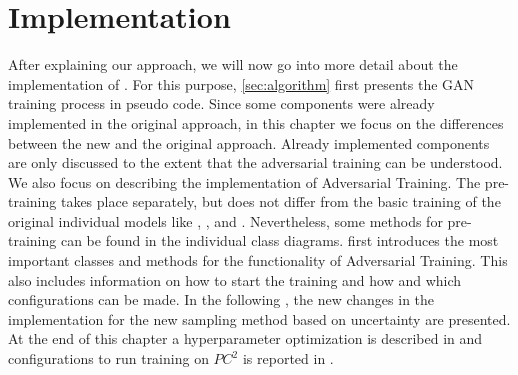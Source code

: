 \chapter{Implementation}
\label{ch:implementation}


After explaining our approach, we will now go into more detail about the implementation of \ucgan.
For this purpose, \autoref{sec:algorithm} first presents the \ac{GAN} training process in pseudo code.
Since some components were already implemented in the original \kbgan approach, in this chapter we focus on the differences between the new \ucgan and the original approach.
Already implemented components are only discussed to the extent that the adversarial training can be understood.
We also focus on describing the implementation of Adversarial Training.
The pre-training takes place separately, but does not differ from the basic training of the original individual models like \distmult, \complex, \transe and \transd.
Nevertheless, some methods for pre-training can be found in the individual class diagrams.
  first introduces the most important classes and methods for the functionality of Adversarial Training.
This also includes information on how to start the training and how and which configurations can be made.
In the following , the new changes in the implementation for the new sampling method based on uncertainty are presented.
At the end of this chapter a hyperparameter optimization is described in  and configurations to run training on $PC^2$ is reported in .










